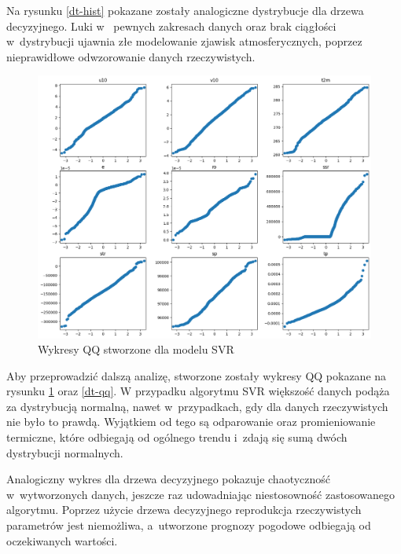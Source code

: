 Na rysunku \ref{dt-hist} pokazane zostały analogiczne dystrybucje dla drzewa decyzyjnego. Luki w~
pewnych zakresach danych oraz brak ciągłości w~dystrybucji ujawnia złe modelowanie zjawisk atmosferycznych,
poprzez nieprawidłowe odwzorowanie danych rzeczywistych. 

\begin{figure}[H]
    \centering
    \includegraphics[width=\textwidth]{images/svr_qq.png}
    \caption{Wykresy QQ stworzone dla modelu SVR}
    \label{svr-qq}
\end{figure}

Aby przeprowadzić dalszą analizę, stworzone zostały wykresy QQ pokazane na rysunku \ref{svr-qq} oraz \ref{dt-qq}.
W przypadku algorytmu SVR większość danych podąża za dystrybucją normalną, nawet w~przypadkach,
gdy dla danych rzeczywistych nie było to prawdą. Wyjątkiem od tego są odparowanie oraz promieniowanie 
termiczne, które odbiegają od ogólnego trendu i~zdają się sumą dwóch dystrybucji normalnych.

Analogiczny wykres dla drzewa decyzyjnego pokazuje chaotyczność w~wytworzonych danych, jeszcze raz 
udowadniając niestosowność zastosowanego algorytmu. Poprzez użycie drzewa decyzyjnego reprodukcja
rzeczywistych parametrów jest niemożliwa, a~utworzone prognozy pogodowe odbiegają od oczekiwanych wartości.

